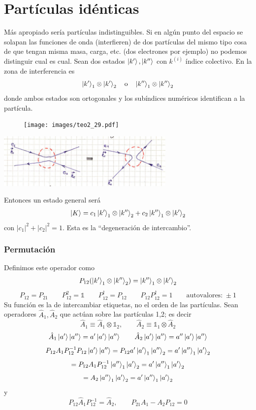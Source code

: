 \documentclass[10pt,oneside]{CBFT_book}
\begin{document}
\chapter{Partículas idénticas}

Más apropiado sería partículas indistinguibles. Si en algún punto del espacio se solapan las funciones de 
onda (interfieren) de dos partículas del mismo tipo cosa de que tengan misma masa, carga, etc. (dos 
electrones por ejemplo) no podemos distinguir cual es cual. Sean dos estados $\Ket{k'},\Ket{k''}$ con $k^{(i)}$ 
índice colectivo. En la zona de interferencia es 
\[
	\Ket{k'}_1 \otimes \Ket{k'}_2 \quad \text{o} \quad \Ket{k''}_1 \otimes \Ket{k''}_2
\]
donde ambos estados son ortogonales y los subíndices numéricos identifican a la partícula. 

\begin{figure}[htb]
	\begin{center}
	\texttt{[image: images/teo2\_29.pdf]}
	\end{center}
	\caption{}
\end{figure} 

	\includegraphics[width=0.65\textwidth]{images/fig_ft2_identical_particles.jpg}

Entonces un estado general será
\[
	\Ket{K} = c_1 \Ket{k'}_1 \otimes \Ket{k''}_2 + c_2 \Ket{k''}_1 \otimes \Ket{k'}_2
\]
con $|c_1|^2 +|c_2|^2= 1$. 
Esta es la ``degeneración de intercambio''.

\subsection{Permutación}

Definimos este operador como 
\[
	P_{12}( \Ket{k'}_1\otimes \Ket{k''}_2 ) = \Ket{k''}_1\otimes \Ket{k'}_2
\]
\[
	P_{12} = P_{21} \qquad P_{12}^2 = \mathbb{1} \qquad P_{12}^\dagger = P_{12} \qquad 
	P_{12}P_{12}^\dagger = 1 \qquad \text{autovalores:} \; \pm 1
\]
Su función es la de intercambiar etiquetas, no el orden de las partículas.
Sean operadores $\hat{A}_1,\hat{A}_2$ que actúan sobre las partículas 1,2; es decir 
\[
	\hat{A}_1 \equiv \hat{A}_1\otimes\mathbb{1}_2, \qquad 
	\hat{A}_2 \equiv \mathbb{1}_1\otimes\hat{A}_2
\]
\[
	\hat{A}_1 \Ket{a'} \Ket{a''} = a' \Ket{a'} \Ket{a''} \qquad 
	\hat{A}_2 \Ket{a'} \Ket{a''} = a'' \Ket{a'} \Ket{a''} 
\]
\[
	P_{12}A_1P_{12}^{-1}P_{12}\Ket{a'} \Ket{a''} = P_{12} a' \Ket{a'}_1 \Ket{a''}_2 =
	a' \Ket{a''}_1 \Ket{a'}_2
\]
\[
	= P_{12}A_1P_{12}^{-1} \Ket{a''}_1 \Ket{a'}_2 = a' \Ket{a''}_1 \Ket{a'}_2
\]
\[
	= A_2 \Ket{a''}_1 \Ket{a'}_2 = a' \Ket{a''}_1 \Ket{a'}_2
\]
y
\[
	P_{12}\hat{A}_1P_{12}^{-1} = \hat{A}_2, \qquad P_{21} A_1 - A_2 P_{12} = 0
\]
\end{document}
